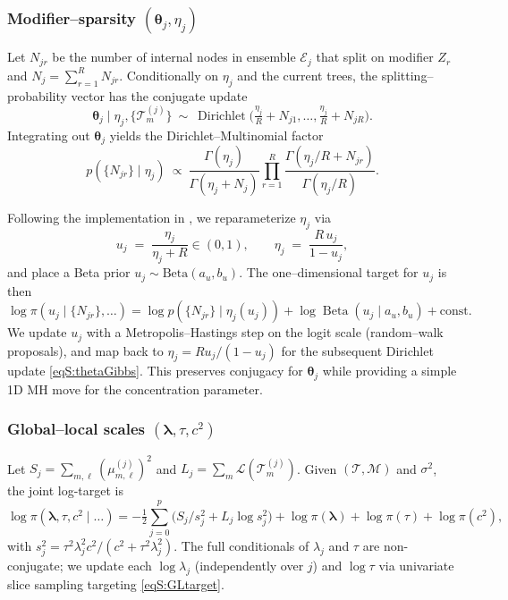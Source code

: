 \documentclass[11pt]{article}
\newcommand{\calL}{\mathcal{L}}
\newcommand{\calM}{\mathcal{M}}
\newcommand{\calT}{\mathcal{T}}
\newcommand{\blambda}{\boldsymbol{\lambda}}
\theoremstyle{plain}
\theoremstyle{definition}
\theoremstyle{plain}
\begin{document}
\subsubsection*{Modifier–sparsity $(\boldsymbol\theta_j,\eta_j)$}
Let $N_{jr}$ be the number of internal nodes in ensemble $\mathcal E_j$ that split on modifier $Z_r$ and $N_j=\sum_{r=1}^R N_{jr}$.  
Conditionally on $\eta_j$ and the current trees, the splitting–probability vector has the conjugate update
\begin{equation}
\label{eqS:thetaGibbs}
\boldsymbol\theta_j \mid \eta_j, \{\mathcal T_m^{(j)}\}
~\sim~
\operatorname{Dirichlet}\!\Big(\tfrac{\eta_j}{R}+N_{j1},\ldots,\tfrac{\eta_j}{R}+N_{jR}\Big).
\end{equation}
Integrating out $\boldsymbol\theta_j$ yields the Dirichlet–Multinomial factor
\begin{equation}
\label{eqS:etaTarget}
p\!\left(\{N_{jr}\}\mid \eta_j\right)
~\propto~
\frac{\Gamma(\eta_j)}{\Gamma(\eta_j+N_j)}\prod_{r=1}^R
\frac{\Gamma\!\left(\eta_j/R+N_{jr}\right)}{\Gamma\!\left(\eta_j/R\right)}.
\end{equation}

Following the implementation in \citet{Deshpande2024}, we reparameterize $\eta_j$ via
\[
u_j \;=\; \frac{\eta_j}{\eta_j+R}\in(0,1), \qquad
\eta_j \;=\; \frac{R\,u_j}{1-u_j},
\]
and place a Beta prior $u_j\sim\mathrm{Beta}(a_u,b_u)$. The one–dimensional target for $u_j$ is then
\[
\log \pi(u_j \mid \{N_{jr}\},\ldots)
= \log p\!\left(\{N_{jr}\}\mid \eta_j(u_j)\right)
+\log\! \operatorname{Beta}(u_j\mid a_u,b_u)
+\text{const}.
\]
We update $u_j$ with a Metropolis–Hastings step on the logit scale (random–walk proposals), and map back to $\eta_j=R u_j/(1-u_j)$ for the subsequent Dirichlet update \eqref{eqS:thetaGibbs}. This preserves conjugacy for $\boldsymbol\theta_j$ while providing a simple 1D MH move for the concentration parameter.

\subsubsection*{Global--local scales $(\blambda,\tau,c^2)$}

Let $S_j=\sum_{m,\ell}(\mu^{(j)}_{m,\ell})^2$ and $L_j=\sum_m \calL(\calT^{(j)}_m)$.
Given $(\calT,\calM)$ and $\sigma^2$, the joint log-target is
\begin{equation}
\label{eqS:GLtarget}
\log \pi(\blambda,\tau,c^2\mid\ldots)
= -\tfrac12\sum_{j=0}^p\!\Big( S_j/s_j^2 + L_j\log s_j^2 \Big)
+ \log\pi(\blambda) + \log\pi(\tau) + \log\pi(c^2),
\end{equation}
with $s_j^2 = {\tau^2 \lambda_j ^2 c^2}/{(c^2+\tau^2\lambda_j^2)}.$ The full conditionals of $\lambda_j$ and $\tau$ are non-conjugate; we update each $\log\lambda_j$ (independently over $j$) and $\log\tau$ via univariate slice sampling targeting \eqref{eqS:GLtarget}. 
\end{document}
